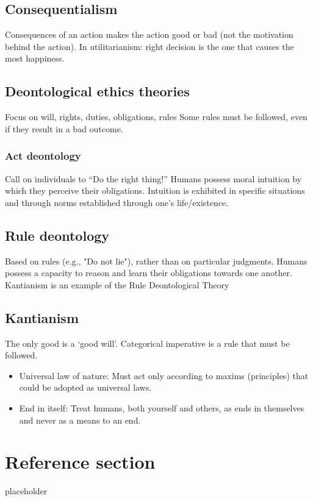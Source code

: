 \documentclass{article}
\begin{document}
\subsection{Consequentialism}
\begin{flushleft}
Consequences of an action makes the action good or bad (not the motivation behind the action). In utilitarianism: right decision is the one that causes the most happiness.
\end{flushleft}

\subsection{Deontological ethics theories}
\begin{flushleft}
Focus on will, rights, duties, obligations, rules Some rules must be followed, even if they result in a bad outcome.
\end{flushleft}

\subsubsection{Act deontology}
\begin{flushleft}
Call on individuals to “Do the right thing!” Humans possess moral intuition by which they perceive their obligations. Intuition is exhibited in specific situations and through norms established through one’s life/existence.
\end{flushleft}

\subsection{Rule deontology}
\begin{flushleft}
Based on rules (e.g., "Do not lie"), rather than on particular judgments. Humans possess a capacity to reason and learn their obligations towards one another. Kantianism is an example of the Rule Deontological Theory
\end{flushleft}

\subsection{Kantianism}
\begin{flushleft}
The only good is a ‘good will’. Categorical imperative is a rule that must be followed.
\begin{itemize}
  \item Universal law of nature: Must act only according to maxims (principles) that could be adopted as universal laws.
  \item End in itself: Treat humans, both yourself and others, as ends in themselves and never as a means to an end.
\end{itemize}
\end{flushleft}

\pagebreak
\section*{Reference section} \label{sec:reference}
\begin{description}
	\item[placeholder] \hfill \\
\end{description}
\end{document}
